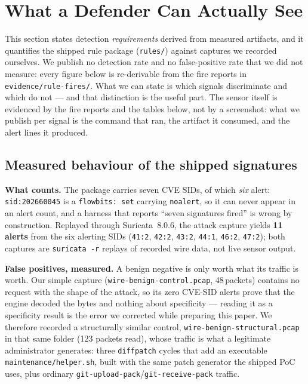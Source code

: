 \documentclass[journal]{IEEEtran}
\begin{document}
\section{What a Defender Can Actually See}
\label{sec:detect}

This section states detection \emph{requirements} derived from measured
artifacts, and it quantifies the shipped rule package (\texttt{rules/}) against
captures we recorded ourselves. We publish no detection rate and no false-positive
rate that we did not measure: every figure below is re-derivable from the fire
reports in \texttt{evidence/rule-fires/}. What we can state is which signals
discriminate and which do not --- and that distinction is the useful part.
The sensor itself is evidenced by the fire reports and the tables below, not by
a screenshot: what we publish per signal is the command that ran, the artifact
it consumed, and the alert lines it produced.

\subsection{Measured behaviour of the shipped signatures}

\textbf{What counts.} The package carries seven CVE SIDs, of which \emph{six}
alert: \texttt{sid:202660045} is a \texttt{flowbits:\,set} carrying
\texttt{noalert}, so it can never appear in an alert count, and a harness that
reports ``seven signatures fired'' is wrong by construction. Replayed through
Suricata~8.0.6, the attack capture yields \textbf{11 alerts} from the six
alerting SIDs (\texttt{41:2}, \texttt{42:2}, \texttt{43:2}, \texttt{44:1},
\texttt{46:2}, \texttt{47:2}); both captures are \texttt{suricata -r} replays of
recorded wire data, not live sensor output.

\textbf{False positives, measured.} A benign negative is only worth what its
traffic is worth. Our simple capture (\texttt{wire-benign-control.pcap},
48\,packets) contains no request with the shape of the attack, so its zero
CVE-SID alerts prove that the engine decoded the bytes and nothing about
specificity --- reading it as a specificity result is the error we corrected
while preparing this paper. We therefore recorded a structurally similar control,
\texttt{wire-benign-structural.pcap} in that same folder (123 packets read),
whose traffic is what a legitimate administrator generates: three
\texttt{diffpatch} cycles that add an executable \texttt{maintenance/helper.sh},
built with the same patch generator the shipped PoC uses, plus ordinary
\texttt{git-upload-pack}\allowbreak/\allowbreak\texttt{git-receive-pack} traffic.
\end{document}
